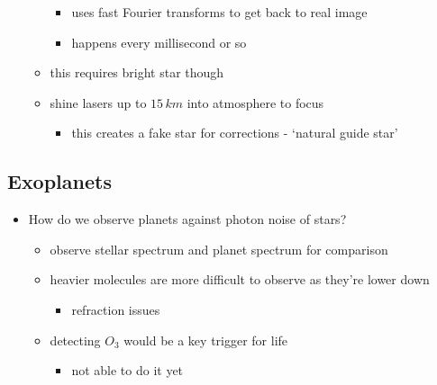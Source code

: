 \documentclass[a4paper,11pt,normalem]{article}
\begin{document}
\begin{itemize}
\begin{itemize}
                \begin{itemize}
                    \item uses fast Fourier transforms to get back to real image
                    \item happens every millisecond or so
                \end{itemize}
            \item this requires bright star though
            \item shine lasers up to \(15\,km\) into atmosphere to focus
                \begin{itemize}
                    \item this creates a fake star for corrections - `natural guide star'
                \end{itemize}
        \end{itemize}
\end{itemize}

\subsection{Exoplanets}

\begin{itemize}
    \item How do we observe planets against photon noise of stars?
        \begin{itemize}
            \item observe stellar spectrum and planet spectrum for comparison
            \item heavier molecules are more difficult to observe as they're lower down
                \begin{itemize}
                    \item refraction issues
                \end{itemize}
            \item detecting \(O_3\) would be a key trigger for life
                \begin{itemize}
                    \item not able to do it yet
                \end{itemize}
        \end{itemize}
\end{itemize}
\end{document}
